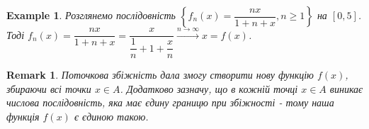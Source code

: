 \documentclass[a4paper, 10pt]{article}
\def\huge{\displaystyle}
\theoremstyle{theoremdd}
\theoremstyle{theoremdd}
\theoremstyle{theoremdd}
\theoremstyle{theoremdd}
\newtheorem{example}[theorem]{Example}
\theoremstyle{theoremdd}
\theoremstyle{theoremdd}
\newtheorem{remark}[theorem]{Remark}
\theoremstyle{theoremdd}
\theoremstyle{theoremdd}
\begin{document}

\begin{example}
Розглянемо послідовність $\left\{ f_n(x) = \dfrac{nx}{1+n+x}, n \geq 1 \right\}$ на $[0,5]$.\\
Тоді $f_n(x) = \dfrac{nx}{1+n+x} = \dfrac{x}{\dfrac{1}{n}+ 1 + \dfrac{x}{n}} \overset{n \to \infty}{\longrightarrow} x = f(x)$.
\end{example}

\begin{remark}
Поточкова збіжність дала змогу створити нову функцію $f(x)$, збираючи всі точки $x \in A$. Додатково зазначу, що в кожній точці $x \in A$ виникає числова послідовність, яка має єдину границю при збіжності - тому наша функція $f(x)$ є єдиною такою. 
\end{remark}

\end{document}

